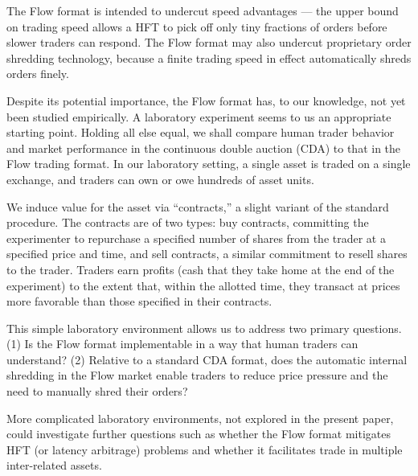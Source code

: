 \documentclass[12pt]{article}
\begin{document}
The Flow format is intended to undercut speed advantages --- the upper bound on trading speed allows a HFT to pick off only tiny fractions of orders before slower traders can respond. 
The Flow format may also undercut proprietary order shredding technology, because a finite trading speed in effect automatically  shreds orders finely. 

Despite its potential importance, the Flow format has, to our knowledge, not yet been studied empirically.
A laboratory experiment seems to us an appropriate starting point. 
Holding all else equal, we shall compare human trader behavior and market performance in the continuous double auction (CDA) to that in the  Flow trading format. In our laboratory setting, a single asset is traded on a single exchange, and traders can own or owe hundreds of asset units. 

We induce value for the asset via ``contracts,'' a slight variant of the standard procedure.  
The contracts are of two types: buy contracts, committing the experimenter to repurchase a specified number of shares from the trader at a specified price and time, and sell contracts, a similar commitment to resell shares to the trader. Traders earn profits (cash that they take home at the end of the experiment) to the extent that,
within the allotted time,
they transact at prices more favorable than those specified in their contracts.

This simple laboratory environment allows us to address two primary questions.
(1) Is the Flow format implementable in a way that human traders can understand?
(2) Relative to a standard CDA format, does the automatic internal shredding in the Flow market enable traders to reduce price pressure and the need to manually shred their orders?

More complicated laboratory environments, not explored in the present paper, could investigate  further questions such as whether the Flow format mitigates HFT (or latency arbitrage) problems  and whether
it facilitates trade in multiple inter-related assets.

\end{document}
